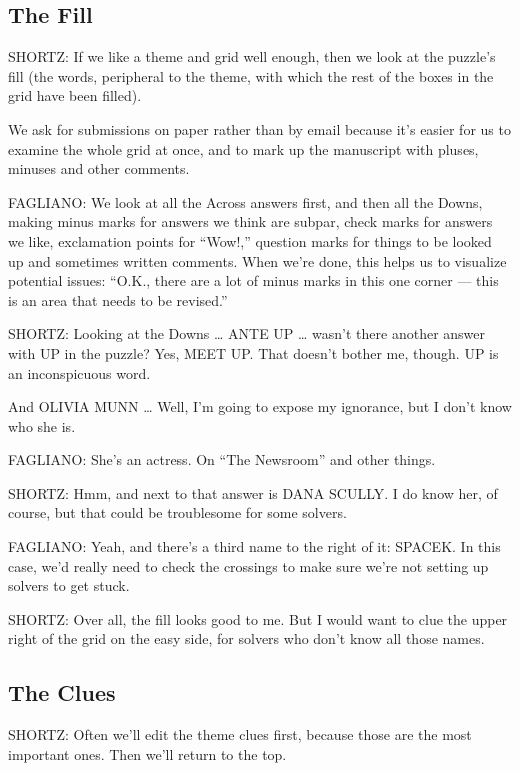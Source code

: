 \hypertarget{the-fill}{%
\subsection{The Fill}\label{the-fill}}

SHORTZ: If we like a theme and grid well enough, then we look at the
puzzle's fill (the words, peripheral to the theme, with which the rest
of the boxes in the grid have been filled).

We ask for submissions on paper rather than by email because it's easier
for us to examine the whole grid at once, and to mark up the manuscript
with pluses, minuses and other comments.

FAGLIANO: We look at all the Across answers first, and then all the
Downs, making minus marks for answers we think are subpar, check marks
for answers we like, exclamation points for ``Wow!,'' question marks for
things to be looked up and sometimes written comments. When we're done,
this helps us to visualize potential issues: ``O.K., there are a lot of
minus marks in this one corner --- this is an area that needs to be
revised.''

SHORTZ: Looking at the Downs \ldots{} ANTE UP \ldots{} wasn't there
another answer with UP in the puzzle? Yes, MEET UP. That doesn't bother
me, though. UP is an inconspicuous word.

And OLIVIA MUNN \ldots{} Well, I'm going to expose my ignorance, but I
don't know who she is.

FAGLIANO: She's an actress. On ``The Newsroom'' and other things.

SHORTZ: Hmm, and next to that answer is DANA SCULLY. I do know her, of
course, but that could be troublesome for some solvers.

FAGLIANO: Yeah, and there's a third name to the right of it: SPACEK. In
this case, we'd really need to check the crossings to make sure we're
not setting up solvers to get stuck.

SHORTZ: Over all, the fill looks good to me. But I would want to clue
the upper right of the grid on the easy side, for solvers who don't know
all those names.

\hypertarget{the-clues}{%
\subsection{The Clues}\label{the-clues}}

SHORTZ: Often we'll edit the theme clues first, because those are the
most important ones. Then we'll return to the top.

